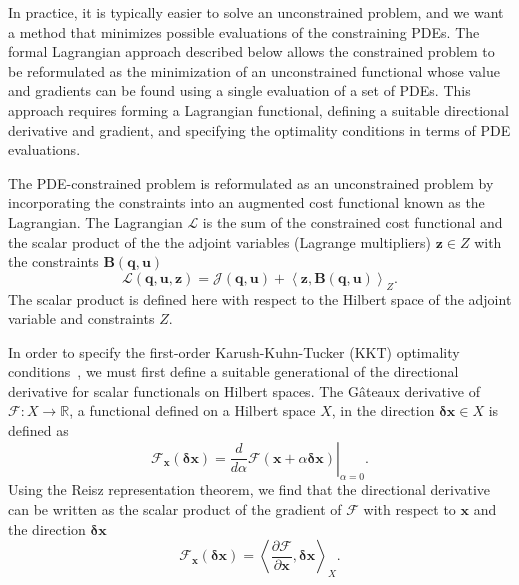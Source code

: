 In practice, it is typically easier to solve an unconstrained problem, and we want a method that minimizes possible evaluations of the constraining PDEs. The formal Lagrangian approach described below allows the constrained problem to be reformulated as the minimization of an unconstrained functional whose value and gradients can be found using a single evaluation of a set of PDEs. This approach requires forming a Lagrangian functional, defining a suitable directional derivative and gradient, and specifying the optimality conditions in terms of PDE evaluations.

The PDE-constrained problem is reformulated as an unconstrained problem by incorporating the constraints into an augmented cost functional known as the Lagrangian. The Lagrangian $\mathcal{L}$ is the sum of the constrained cost functional and the scalar product of the the adjoint variables (Lagrange multipliers) $\mathbf{z} \in Z$ with the constraints $\mathbf{B}(\mathbf{q}, \mathbf{u})$
\begin{equation}
\mathcal{L}(\mathbf{q}, \mathbf{u}, \mathbf{z}) = \mathcal{J}(\mathbf{q}, \mathbf{u} ) + \left \langle \mathbf{z}, \mathbf{B}(\mathbf{q}, \mathbf{u}) \right \rangle_Z.
\end{equation}
The scalar product is defined here with respect to the Hilbert space of the adjoint variable and constraints $Z$.

In order to specify the first-order Karush-Kuhn-Tucker (KKT) optimality conditions~\cite{Boyd2004a}, we must first define a suitable generational of the directional derivative for scalar functionals on Hilbert spaces. The G\^{a}teaux derivative of $\mathcal{F}: X \rightarrow \mathbb{R}$, a functional defined on a Hilbert space $X$, in the direction $\boldsymbol \delta \mathbf{x} \in X$ is defined as
\begin{equation}
\mathcal{F}_\mathbf{x}(\boldsymbol \delta \mathbf{x}) = \left. \frac{d}{d\alpha} \mathcal{F}(\mathbf{x} + \alpha \boldsymbol \delta \mathbf{x}) \right\vert_{\alpha=0}.
\end{equation}
Using the Reisz representation theorem, we find that the directional derivative can be written as the scalar product of the gradient of $\mathcal{F}$ with respect to $\mathbf{x}$ and the direction $\boldsymbol \delta \mathbf{x}$
\begin{equation}
\mathcal{F}_\mathbf{x}(\boldsymbol \delta \mathbf{x}) = \left \langle \frac{\partial \mathcal{F}}{\partial \mathbf{x}}, \boldsymbol \delta \mathbf{x} \right \rangle_X.
\end{equation}


